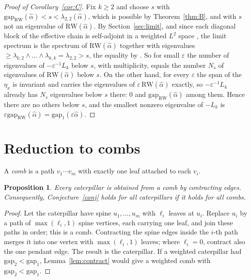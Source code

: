 \documentclass[11pt]{article}
\newtheorem{proposition}[theorem]{Proposition}
\theoremstyle{remark}
\newcommand{\gap}{\mathrm{gap}}
\newcommand{\RW}{\mathrm{RW}}
\newcommand{\eps}{\varepsilon}
\begin{document}
\begin{proof}[Proof of Corollary~\ref{cor:C}]
Fix $k\ge2$ and choose $s$ with $\gap_{\RW}(\hat\alpha)<s<\lambda_{2,2}(\hat\alpha)$, which is possible by Theorem~\ref{thm:B}, and with $s$ not an eigenvalue of $\RW(\hat\alpha)$. By Section~\ref{sec:limit}, and since each diagonal block of the effective chain is self-adjoint in a weighted $L^2$ space \cite[Lemma~5.9]{KS25}, the limit spectrum is the spectrum of $\RW(\hat\alpha)$ together with eigenvalues $\ge\lambda_{k,2}\wedge\dots\wedge\lambda_{k,k}=\lambda_{2,2}>s$, the equality by \cite[Propositions~5.10 and~5.14]{KS25}. So for small $\eps$ the number of eigenvalues of $-\eps^{-1}L_k$ below $s$, with multiplicity, equals the number $N_s$ of eigenvalues of $\RW(\hat\alpha)$ below $s$. On the other hand, for every $\eps$ the span of the $\eta_x$ is invariant and carries the eigenvalues of $\eps\,\RW(\hat\alpha)$ exactly, so $-\eps^{-1}L_k$ already has $N_s$ eigenvalues below $s$ there: $0$ and $\gap_{\RW}(\hat\alpha)$ among them. Hence there are no others below $s$, and the smallest nonzero eigenvalue of $-L_k$ is $\eps\gap_{\RW}(\hat\alpha)=\gap_1(\eps\hat\alpha)$.
\end{proof}

\section{Reduction to combs}\label{sec:comb}

A \emph{comb} is a path $v_1\cdots v_m$ with exactly one leaf attached to each $v_i$.

\begin{proposition}\label{prop:comb}
Every caterpillar is obtained from a comb by contracting edges. Consequently, Conjecture~\ref{conj} holds for all caterpillars if it holds for all combs.
\end{proposition}

\begin{proof}
Let the caterpillar have spine $u_1,\dots,u_m$ with $\ell_i$ leaves at $u_i$. Replace $u_i$ by a path of $\max(\ell_i,1)$ spine vertices, each carrying one leaf, and join these paths in order; this is a comb. Contracting the spine edges inside the $i$-th path merges it into one vertex with $\max(\ell_i,1)$ leaves; where $\ell_i=0$, contract also the one pendant edge. The result is the caterpillar. If a weighted caterpillar had $\gap_2<\gap_1$, Lemma~\ref{lem:contract} would give a weighted comb with $\gap_2<\gap_1$.
\end{proof}
\end{document}

